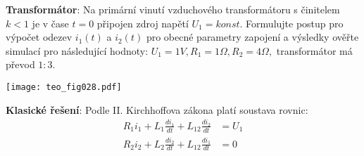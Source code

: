 \begin{example}\label{TEO:exam005} \textbf{Transformátor}: \newline
  Na primární vinutí vzduchového transformátoru s činitelem $k < 1$ je v čase $t=0$ připojen zdroj 
  napětí $U_1 = konst$. Formulujte postup pro výpočet odezev $i_1(t)$ a $i_2(t)$ pro obecné 
  parametry zapojení a výsledky ověřte simulací pro následující hodnoty: $U_1 = 1V, R_1 = 1\Omega, 
  R_2 = 4\Omega, $ transformátor má převod $1:3$.
  
  {\centering
   \captionsetup{type=figure}
   \texttt{[image: teo\_fig028.pdf]}
   \label{teo:fig028}
   \par}
  
  \textbf{Klasické řešení}: Podle II. Kirchhoffova zákona platí soustava rovnic:
  \begin{subequations}\label{TEO:eq_trafo_IIKz}
    \begin{align}
      R_1i_1 + L_1\frac{di_1}{dt} + L_{12}\frac{di_2}{dt} &= U_1 \\
      R_2i_2 + L_2\frac{di_2}{dt} + L_{12}\frac{di_1}{dt} &= 0
    \end{align}
  \end{subequations}
  

\end{example}
